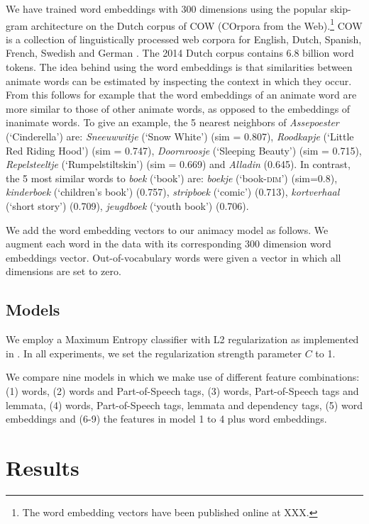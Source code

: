 \documentclass[a4paper,UKenglish]{oasics}
\begin{document}

We have trained word embeddings with 300 dimensions using the popular
skip-gram architecture \cite{mikolov:13} on the Dutch corpus of COW
(COrpora from the Web).\footnote{The word embedding vectors have been
  published online at XXX.} COW is a collection of linguistically
processed web corpora for English, Dutch, Spanish, French, Swedish and
German \cite{schaefer:12}. The 2014 Dutch corpus contains 6.8 billion
word tokens. The idea behind using the word embeddings is that
similarities between animate words can be estimated by inspecting the
context in which they occur. From this follows for example that the word
embeddings of an animate word are more similar to those of other
animate words, as opposed to the embeddings of inanimate words. To give an
example, the 5 nearest neighbors of \textit{Assepoester}
(`Cinderella') are: \textit{Sneeuwwitje} (`Snow White') (sim = 0.807),
\textit{Roodkapje} (`Little Red Riding Hood') (sim = 0.747),
\textit{Doornroosje} (`Sleeping Beauty') (sim = 0.715),
\textit{Repelsteeltje} (`Rumpelstiltskin') (sim = 0.669) and
\textit{Alladin} (0.645). In contrast, the 5 most similar words to
\textit{boek} (`book') are: \textit{boekje} (`book-\textsc{dim}')
(sim=0.8), \textit{kinderboek} (`children's book') (0.757),
\textit{stripboek} (`comic') (0.713), \textit{kortverhaal} (`short
story') (0.709), \textit{jeugdboek} (`youth book') (0.706).

We add the word embedding vectors to our animacy model as follows. We
augment each word in the data with its corresponding 300 dimension
word embeddings vector. Out-of-vocabulary words were given a vector in
which all dimensions are set to zero.


\subsection{Models}
We employ a Maximum Entropy classifier with L2 regularization as
implemented in \cite{sklearn}. In all experiments, we set the
regularization strength parameter $C$ to 1.

We compare nine models in which we make use of different feature
combinations: (1) words, (2) words and Part-of-Speech tags, (3)
words, Part-of-Speech tags and lemmata, (4) words, Part-of-Speech
tags, lemmata and dependency tags, (5) word embeddings and (6-9) the
features in model 1 to 4 plus word embeddings.


\section{Results}\label{sec:results}
\end{document}
